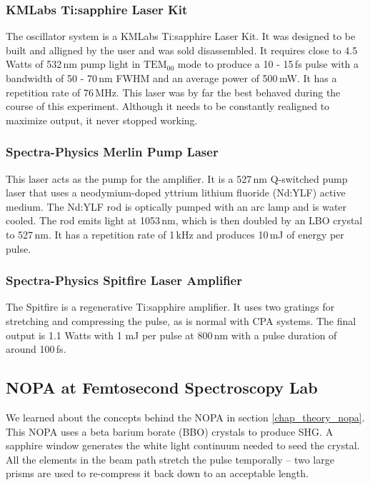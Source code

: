 \subsubsection{KMLabs Ti:sapphire Laser Kit}
The oscillator system is a KMLabs Ti:sapphire Laser Kit. It was designed to be built and alligned by the user and was sold disassembled. It requires close to 4.5\,Watts of 532\,nm pump light in $\text{TEM}_{00}$ mode to produce a 10 - 15\,fs pulse with a bandwidth of 50 - 70\,nm FWHM and an average power of 500\,mW. It has a repetition rate of 76\,MHz. This laser was by far the best behaved during the course of this experiment. Although it needs to be constantly realigned to maximize output, it never stopped working.

\subsubsection{Spectra-Physics Merlin Pump Laser}
This laser acts as the pump for the amplifier. It is a 527\,nm Q-switched pump laser that uses a neodymium-doped yttrium lithium fluoride (Nd:YLF) active medium. The Nd:YLF rod is optically pumped with an arc lamp and is water cooled. The rod emits light at 1053\,nm, which is then doubled by an LBO crystal to 527\,nm. It has a repetition rate of 1\,kHz and produces 10\,mJ of energy per pulse. 

\subsubsection{Spectra-Physics Spitfire Laser Amplifier}
The Spitfire is a regenerative Ti:sapphire amplifier. It uses two gratings for stretching and compressing the pulse, as is normal with CPA systems. The final output is 1.1 Watts with 1 mJ per pulse at 800\,nm with a pulse duration of around 100\,fs.

\subsection{NOPA at Femtosecond Spectroscopy Lab}

We learned about the concepts behind the NOPA in section \ref{chap_theory_nopa}. This NOPA uses a beta barium borate (BBO) crystals to produce SHG. A sapphire window generates the white light continuum needed to seed the crystal. All the elements in the beam path stretch the pulse temporally -- two large prisms are used to re-compress it back down to an acceptable length.

